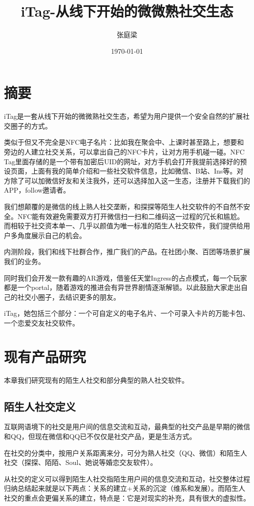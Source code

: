 \documentclass[UTF8]{ctexart}
\title{iTag-从线下开始的微微熟社交生态}
\author{张庭梁}
\date{\today}
\begin{document}
\maketitle

\section{摘要}

iTag是一套从线下开始的微微熟社交生态，希望为用户提供一个安全自然的扩展社交圈子的方式。

类似于但又不完全是NFC电子名片：比如我在聚会中、上课时甚至路上，想要和旁边的人建立社交关系，可以拿出自己的NFC卡片，让对方用手机碰一碰。NFC Tag里面存储的是一个带有加密后UID的网址，对方手机会打开我提前选择好的预设页面，上面有我的简单介绍和一些社交软件信息，比如微信、B站、Ins等。对方除了可以加微信好友和关注我外，还可以选择加入这一生态，注册并下载我们的APP，follow邀请者。

我们想颠覆的是微信的线上熟人社交垄断，和探探等陌生人社交软件的不自然不安全。NFC能有效避免需要双方打开微信扫一扫和二维码这一过程的冗长和尴尬。而相较于社交资本单一、几乎以颜值为唯一标准的陌生人社交软件，我们提供给用户多角度展示自己的机会。

内测阶段，我们和线下社群合作，推广我们的产品。在社团小聚、百团等场景扩展我们的业务。

同时我们会开发一款有趣的AR游戏，借鉴任天堂Ingress的占点模式，每一个玩家都是一个portal，随着游戏的推进会有异世界剧情逐渐解锁。以此鼓励大家走出自己的社交小圈子，去结识更多的朋友。

iTag，她包括三个部分：一个可自定义的电子名片、一个可录入卡片的万能卡包、一个恋爱交友社交软件。

\section{现有产品研究}
本章我们研究现有的陌生人社交和部分典型的熟人社交软件。

\subsection{陌生人社交定义}

\begin{tcolorbox}
    互联网语境下的社交是用户间的信息交流和互动，最典型的社交产品是早期的微信和QQ，但现在微信和QQ已不仅仅是社交产品，更是生活方式。

    在社交的分类中，按用户关系距离来分，可分为熟人社交（QQ、微信）和陌生人社交（探探、陌陌、Soul、她说等婚恋交友软件）。

    从社交的定义可以得到陌生人社交指陌生用户间的信息交流和互动，社交整体过程归纳总结起来就是以下两点：关系的建立+关系的沉淀（维系和发展）。而陌生人社交的重点会更偏关系的建立，特点是：它是对现实的补充，具有很大的虚拟性。\cite{StrangerDefine}
\end{tcolorbox}
\end{document}
